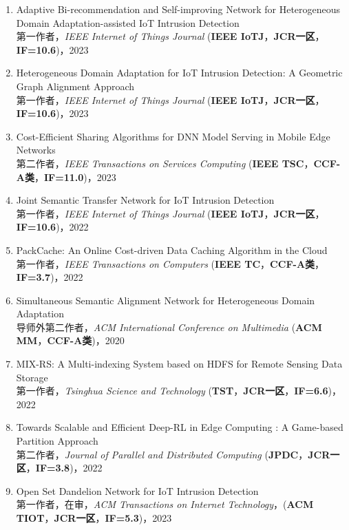 \documentclass[UTF8,letterpaper,11pt]{article}
\begin{document}
\begin{enumerate}
  \setlength\itemsep{1pt}
  \item Adaptive Bi-recommendation and Self-improving Network for Heterogeneous Domain Adaptation-assisted IoT Intrusion Detection\\
  第一作者，\textit{IEEE Internet of Things Journal} (\textbf{IEEE IoTJ}，\textbf{JCR一区}，\textbf{IF=10.6})，2023

  \item Heterogeneous Domain Adaptation for IoT Intrusion Detection: A Geometric Graph Alignment Approach\\
  第一作者，\textit{IEEE Internet of Things Journal} (\textbf{IEEE IoTJ}，\textbf{JCR一区}，\textbf{IF=10.6})，2023

  \item Cost-Efficient Sharing Algorithms for DNN Model Serving in Mobile Edge Networks\\
  第二作者，\textit{IEEE Transactions on Services Computing} (\textbf{IEEE TSC}，\textbf{CCF-A类}，\textbf{IF=11.0})，2023

  \item Joint Semantic Transfer Network for IoT Intrusion Detection\\
  第一作者，\textit{IEEE Internet of Things Journal} (\textbf{IEEE IoTJ}，\textbf{JCR一区}，\textbf{IF=10.6})，2022

  \item PackCache: An Online Cost-driven Data Caching Algorithm in the Cloud\\
  第一作者，\textit{IEEE Transactions on Computers} (\textbf{IEEE TC}，\textbf{CCF-A类}，\textbf{IF=3.7})，2022

  \item Simultaneous Semantic Alignment Network for Heterogeneous Domain Adaptation\\
  导师外第二作者，\textit{ACM International Conference on Multimedia} (\textbf{ACM MM}，\textbf{CCF-A类})，2020

  \item MIX-RS: A Multi-indexing System based on HDFS for Remote Sensing Data Storage\\
  第一作者，\textit{Tsinghua Science and Technology} (\textbf{TST}，\textbf{JCR一区}，\textbf{IF=6.6})，2022

  \item Towards Scalable and Efficient Deep-RL in Edge Computing : A Game-based Partition Approach\\
  第二作者，\textit{Journal of Parallel and Distributed Computing} (\textbf{JPDC}，\textbf{JCR一区}，\textbf{IF=3.8})，2022

  \item Open Set Dandelion Network for IoT Intrusion Detection\\
  第一作者，在审，\textit{ACM Transactions on Internet Technology}，(\textbf{ACM TIOT}，\textbf{JCR一区}，\textbf{IF=5.3})，2023
\end{enumerate}
\end{document}
